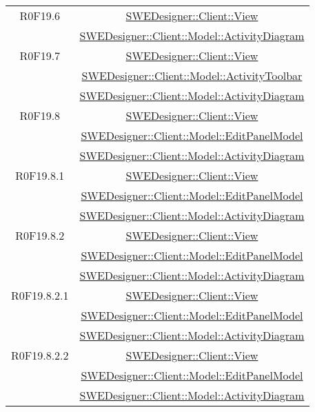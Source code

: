 \documentclass[../SpecificaTecnica.tex]{subfiles}
\begin{document}
\begin{longtable}{|c|c|}
		R0F19.6 & \hyperlink{SWEDesigner::Client::View}{SWEDesigner::Client::View} \\& \hyperlink{SWEDesigner::Client::Model::ActivityDiagram}{SWEDesigner::Client::Model::ActivityDiagram} \\\hline
		R0F19.7 & \hyperlink{SWEDesigner::Client::View}{SWEDesigner::Client::View} \\& \hyperlink{SWEDesigner::Client::Model::ActivityToolbar}{SWEDesigner::Client::Model::ActivityToolbar} \\& \hyperlink{SWEDesigner::Client::Model::ActivityDiagram}{SWEDesigner::Client::Model::ActivityDiagram}\\\hline
		R0F19.8 & \hyperlink{SWEDesigner::Client::View}{SWEDesigner::Client::View} \\& \hyperlink{SWEDesigner::Client::Model::EditPanelModel}{SWEDesigner::Client::Model::EditPanelModel} \\& \hyperlink{SWEDesigner::Client::Model::ActivityDiagram}{SWEDesigner::Client::Model::ActivityDiagram} \\\hline
		R0F19.8.1 & \hyperlink{SWEDesigner::Client::View}{SWEDesigner::Client::View} \\& \hyperlink{SWEDesigner::Client::Model::EditPanelModel}{SWEDesigner::Client::Model::EditPanelModel} \\& \hyperlink{SWEDesigner::Client::Model::ActivityDiagram}{SWEDesigner::Client::Model::ActivityDiagram} \\\hline
		R0F19.8.2 & \hyperlink{SWEDesigner::Client::View}{SWEDesigner::Client::View} \\& \hyperlink{SWEDesigner::Client::Model::EditPanelModel}{SWEDesigner::Client::Model::EditPanelModel} \\& \hyperlink{SWEDesigner::Client::Model::ActivityDiagram}{SWEDesigner::Client::Model::ActivityDiagram} \\\hline
		R0F19.8.2.1 & \hyperlink{SWEDesigner::Client::View}{SWEDesigner::Client::View} \\& \hyperlink{SWEDesigner::Client::Model::EditPanelModel}{SWEDesigner::Client::Model::EditPanelModel} \\& \hyperlink{SWEDesigner::Client::Model::ActivityDiagram}{SWEDesigner::Client::Model::ActivityDiagram} \\\hline
		R0F19.8.2.2 & \hyperlink{SWEDesigner::Client::View}{SWEDesigner::Client::View} \\& \hyperlink{SWEDesigner::Client::Model::EditPanelModel}{SWEDesigner::Client::Model::EditPanelModel} \\& \hyperlink{SWEDesigner::Client::Model::ActivityDiagram}{SWEDesigner::Client::Model::ActivityDiagram} \\\hline

\end{longtable}
\end{document}
